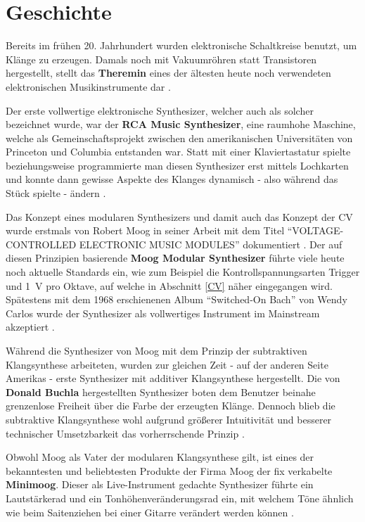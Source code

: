 \section{Geschichte}
\label{sec:org2b97f9d}
Bereits im frühen 20. Jahrhundert wurden elektronische Schaltkreise benutzt, um Klänge zu erzeugen. Damals noch mit Vakuumröhren statt Transistoren hergestellt, stellt das \textbf{Theremin} eines der ältesten heute noch verwendeten elektronischen Musikinstrumente dar \cite{thomann:theremin}. 

Der erste vollwertige elektronische Synthesizer, welcher auch als solcher bezeichnet wurde, war der \textbf{RCA Music Synthesizer}, eine raumhohe Maschine, welche als Gemeinschaftsprojekt zwischen den amerikanischen Universitäten von Princeton und Columbia entstanden war. Statt mit einer Klaviertastatur spielte beziehungsweise programmierte man diesen Synthesizer erst mittels Lochkarten und konnte dann gewisse Aspekte des Klanges dynamisch - also während das Stück spielte - ändern \cite{adafruit:RCA}.

Das Konzept eines modularen Synthesizers und damit auch das Konzept der \acl{CV} wurde erstmals von Robert Moog in seiner Arbeit mit dem Titel "`VOLTAGE-CONTROLLED ELECTRONIC MUSIC MODULES"' dokumentiert \cite{moog1964}. Der auf diesen Prinzipien basierende \textbf{Moog Modular Synthesizer} führte viele heute noch aktuelle Standards ein, wie zum Beispiel die Kontrollspannungsarten Trigger und \SI{1}{\volt} pro Oktave, auf welche in Abschnitt \ref{CV} näher eingegangen wird. Spätestens mit dem 1968 erschienenen Album "`Switched-On Bach"' von Wendy Carlos wurde der Synthesizer als vollwertiges Instrument im Mainstream akzeptiert \cite{yamaha:history} \cite{120years:moog}. 

Während die Synthesizer von Moog mit dem Prinzip der subtraktiven Klangsynthese arbeiteten, wurden zur gleichen Zeit - auf der anderen Seite Amerikas - erste Synthesizer mit additiver Klangsynthese hergestellt. Die von \textbf{Donald Buchla} hergestellten Synthesizer boten dem Benutzer beinahe grenzenlose Freiheit über die Farbe der erzeugten Klänge. Dennoch blieb die subtraktive Klangsynthese wohl aufgrund größerer Intuitivität und besserer technischer Umsetzbarkeit das vorherrschende Prinzip \cite{120years:buchla}. 

Obwohl Moog als Vater der modularen Klangsynthese gilt, ist eines der bekanntesten und beliebtesten Produkte der Firma Moog der fix verkabelte \textbf{Minimoog}. Dieser als Live-Instrument gedachte Synthesizer führte ein Lautstärkerad und ein Tonhöhenveränderungsrad ein, mit welchem Töne ähnlich wie beim Saitenziehen bei einer Gitarre verändert werden können \cite{120years:moog}.

